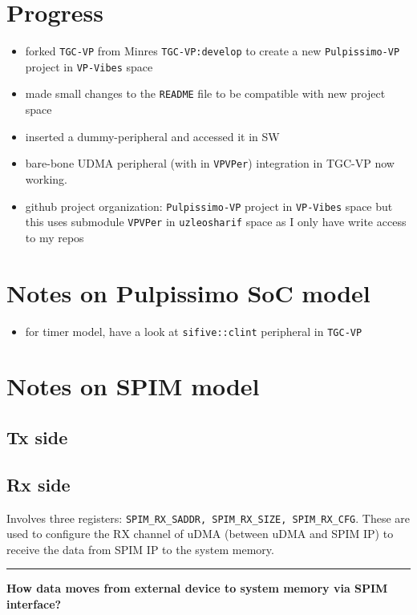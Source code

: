 \documentclass{article}
\begin{document}
\section{Progress}
\begin{itemize}
 \item forked \texttt{TGC-VP} from Minres \texttt{TGC-VP:develop} to create a new \texttt{Pulpissimo-VP} project in
       \texttt{VP-Vibes} space
 \item made small changes to the \texttt{README} file to be compatible with new project space
 \item inserted a dummy-peripheral and accessed it in SW
 \item bare-bone UDMA peripheral (with in \texttt{VPVPer}) integration in TGC-VP now working.
 \item github project organization: \texttt{Pulpissimo-VP} project in \texttt{VP-Vibes} space but this uses
       submodule \texttt{VPVPer} in \texttt{uzleosharif} space as I only have write access to my repos
\end{itemize}

\section{Notes on Pulpissimo SoC model}
\begin{itemize}
 \item for timer model, have a look at \texttt{sifive::clint} peripheral in \texttt{TGC-VP}
\end{itemize}

\section{Notes on SPIM model}
\subsection{Tx side}

\subsection{Rx side}
Involves three registers: \texttt{SPIM\_RX\_SADDR, SPIM\_RX\_SIZE, SPIM\_RX\_CFG}. These are used to configure the RX
channel of uDMA (between uDMA and SPIM IP) to receive the data from SPIM IP to the system memory.

\noindent \rule[0.5ex]{\linewidth}{1pt}

\noindent \textbf{How data moves from external device to system memory via SPIM interface?}
\end{document}
